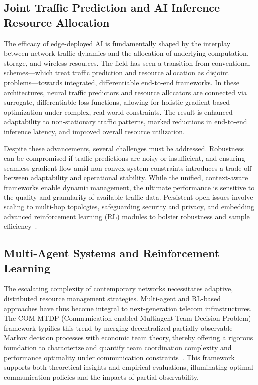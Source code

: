 \documentclass[11pt]{article}
\begin{document}
\subsection{Joint Traffic Prediction and AI Inference Resource Allocation}

The efficacy of edge-deployed AI is fundamentally shaped by the interplay between network traffic dynamics and the allocation of underlying computation, storage, and wireless resources. The field has seen a transition from conventional schemes—which treat traffic prediction and resource allocation as disjoint problems—towards integrated, differentiable end-to-end frameworks. In these architectures, neural traffic predictors and resource allocators are connected via surrogate, differentiable loss functions, allowing for holistic gradient-based optimization under complex, real-world constraints. The result is enhanced adaptability to non-stationary traffic patterns, marked reductions in end-to-end inference latency, and improved overall resource utilization.

Despite these advancements, several challenges must be addressed. Robustness can be compromised if traffic predictions are noisy or insufficient, and ensuring seamless gradient flow amid non-convex system constraints introduces a trade-off between adaptability and operational stability. While the unified, context-aware frameworks enable dynamic management, the ultimate performance is sensitive to the quality and granularity of available traffic data. Persistent open issues involve scaling to multi-hop topologies, safeguarding security and privacy, and embedding advanced reinforcement learning (RL) modules to bolster robustness and sample efficiency~\cite{ref48}.

\subsection{Multi-Agent Systems and Reinforcement Learning}

The escalating complexity of contemporary networks necessitates adaptive, distributed resource management strategies. Multi-agent and RL-based approaches have thus become integral to next-generation telecom infrastructures. The COM-MTDP (Communication-enabled Multiagent Team Decision Problem) framework typifies this trend by merging decentralized partially observable Markov decision processes with economic team theory, thereby offering a rigorous foundation to characterize and quantify team coordination complexity and performance optimality under communication constraints~\cite{ref32}. This framework supports both theoretical insights and empirical evaluations, illuminating optimal communication policies and the impacts of partial observability.
\end{document}
